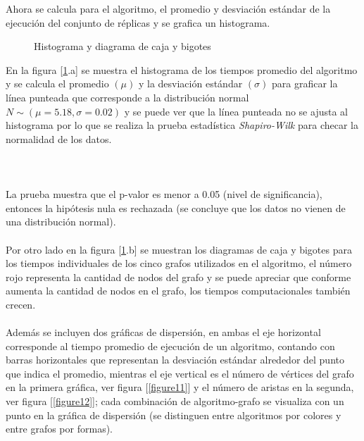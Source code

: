 \documentclass[a4paper, 11pt]{article}
\begin{document}
Ahora se calcula para el algoritmo, el promedio y desviación estándar de la ejecución del conjunto de réplicas y se grafica un histograma.

\begin{figure}[H]
\centering
{}
\caption{Histograma y diagrama de caja y bigotes} \label{figure10}
\end{figure}

En la figura [\ref{figure10}.a] se muestra el histograma de los tiempos promedio del algoritmo y se calcula el promedio $(\mu)$ y la desviación estándar $(\sigma)$ para graficar la línea punteada que corresponde a la distribución normal $N\sim(\mu=5.18, \sigma=0.02)$ y se puede ver que la línea punteada no se ajusta al histograma por lo que se realiza la prueba estadística \textit{Shapiro-Wilk} para checar la normalidad de los datos.
\\
\\
\noindent{}
\\
\\
La prueba muestra que el p-valor es menor a 0.05 (nivel de significancia), entonces la hipótesis nula es rechazada (se concluye que los datos no vienen de una distribución normal).
\\
\\
Por otro lado en la figura [\ref{figure10}.b] se muestran los diagramas de caja y bigotes para los tiempos individuales de los cinco grafos utilizados en el algoritmo, el número rojo representa la cantidad de nodos del grafo y se puede apreciar que conforme aumenta la cantidad de nodos en el grafo, los tiempos computacionales también crecen.
\\
\\
Además se incluyen dos gráficas de dispersión, en ambas el eje horizontal corresponde al tiempo promedio de ejecución de un algoritmo, contando con barras horizontales que representan la desviación estándar alrededor del punto que indica el promedio, mientras el eje vertical es el número de vértices del grafo en la primera gráfica, ver figura [\ref{figure11}] y el número de aristas en la segunda, ver figura [\ref{figure12}]; cada combinación de algoritmo-grafo se visualiza con un punto en la gráfica de dispersión (se distinguen entre algoritmos por colores y entre grafos por formas). 
\end{document}
